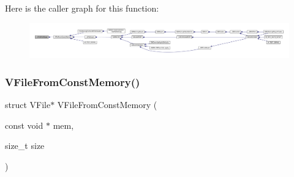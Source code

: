 Here is the caller graph for this function\+:
\nopagebreak
\begin{figure}[H]
\begin{center}
\leavevmode
\includegraphics[width=350pt]{vfs-mem_8c_afac142894089fc65408a65e519c5bcb7_icgraph}
\end{center}
\end{figure}
\mbox{\label{vfs-mem_8c_a45c0959a6de2f83dc17c5b00b93352f3}} 
\subsubsection{\texorpdfstring{V\+File\+From\+Const\+Memory()}{VFileFromConstMemory()}}
{\footnotesize\ttfamily struct V\+File$\ast$ V\+File\+From\+Const\+Memory (\begin{DoxyParamCaption}\item[{const void $\ast$}]{mem,  }\item[{size\+\_\+t}]{size }\end{DoxyParamCaption})}

